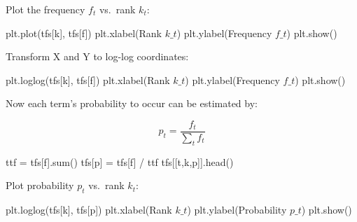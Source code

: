 \documentclass[
  letterpaper,
]{scrbook}
\newenvironment{Shaded}{\begin{snugshade}}{\end{snugshade}}
\newcommand{\BuiltInTok}[1]{\textcolor[rgb]{0.00,0.23,0.31}{#1}}
\newcommand{\NormalTok}[1]{\textcolor[rgb]{0.00,0.23,0.31}{#1}}
\newcommand{\OperatorTok}[1]{\textcolor[rgb]{0.37,0.37,0.37}{#1}}
\newcommand{\StringTok}[1]{\textcolor[rgb]{0.13,0.47,0.30}{#1}}
\begin{document}
Plot the frequency \(f_t\) vs.~rank \(k_t\):

\begin{Shaded}
\begin{Highlighting}[]
\NormalTok{plt.plot(tfs[}\StringTok{\textquotesingle{}k\textquotesingle{}}\NormalTok{], tfs[}\StringTok{\textquotesingle{}f\textquotesingle{}}\NormalTok{])}
\NormalTok{plt.xlabel(}\StringTok{\textquotesingle{}Rank $k\_t$\textquotesingle{}}\NormalTok{)}
\NormalTok{plt.ylabel(}\StringTok{\textquotesingle{}Frequency $f\_t$\textquotesingle{}}\NormalTok{)}
\NormalTok{plt.show()}
\end{Highlighting}
\end{Shaded}

Transform X and Y to log-log coordinates:

\begin{Shaded}
\begin{Highlighting}[]
\NormalTok{plt.loglog(tfs[}\StringTok{\textquotesingle{}k\textquotesingle{}}\NormalTok{], tfs[}\StringTok{\textquotesingle{}f\textquotesingle{}}\NormalTok{])}
\NormalTok{plt.xlabel(}\StringTok{\textquotesingle{}Rank $k\_t$\textquotesingle{}}\NormalTok{)}
\NormalTok{plt.ylabel(}\StringTok{\textquotesingle{}Frequency $f\_t$\textquotesingle{}}\NormalTok{)}
\NormalTok{plt.show()}
\end{Highlighting}
\end{Shaded}

Now each term's probability to occur can be estimated by:

\[ p_t = \frac{f_t}{\sum_t f_t} \]

\begin{Shaded}
\begin{Highlighting}[]
\NormalTok{ttf }\OperatorTok{=}\NormalTok{ tfs[}\StringTok{\textquotesingle{}f\textquotesingle{}}\NormalTok{].}\BuiltInTok{sum}\NormalTok{()}
\NormalTok{tfs[}\StringTok{\textquotesingle{}p\textquotesingle{}}\NormalTok{] }\OperatorTok{=}\NormalTok{ tfs[}\StringTok{\textquotesingle{}f\textquotesingle{}}\NormalTok{] }\OperatorTok{/}\NormalTok{ ttf}
\NormalTok{tfs[[}\StringTok{\textquotesingle{}t\textquotesingle{}}\NormalTok{,}\StringTok{\textquotesingle{}k\textquotesingle{}}\NormalTok{,}\StringTok{\textquotesingle{}p\textquotesingle{}}\NormalTok{]].head()}
\end{Highlighting}
\end{Shaded}

Plot probability \(p_t\) vs.~rank \(k_t\):

\begin{Shaded}
\begin{Highlighting}[]
\NormalTok{plt.loglog(tfs[}\StringTok{\textquotesingle{}k\textquotesingle{}}\NormalTok{], tfs[}\StringTok{\textquotesingle{}p\textquotesingle{}}\NormalTok{])}
\NormalTok{plt.xlabel(}\StringTok{\textquotesingle{}Rank $k\_t$\textquotesingle{}}\NormalTok{)}
\NormalTok{plt.ylabel(}\StringTok{\textquotesingle{}Probability $p\_t$\textquotesingle{}}\NormalTok{)}
\NormalTok{plt.show()}
\end{Highlighting}
\end{Shaded}
\end{document}
